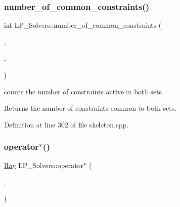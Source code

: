 \mbox{\label{group___c_l_s_solvers_gad030de457424bef601e2903eb619926e}} 
\subsubsection{\texorpdfstring{number\+\_\+of\+\_\+common\+\_\+constraints()}{number\_of\_common\_constraints()}}
{\footnotesize\ttfamily int L\+P\+\_\+\+Solvers\+::number\+\_\+of\+\_\+common\+\_\+constraints (\begin{DoxyParamCaption}\item[{bool $\ast$}]{,  }\item[{bool $\ast$}]{,  }\item[{unsigned}]{ }\end{DoxyParamCaption})}



counts the number of constraints active in both sets 

\begin{DoxyReturn}{Returns}
the number of constraints common to both sets. 
\end{DoxyReturn}


Definition at line 302 of file skeleton.\+cpp.

\mbox{\label{group___c_l_s_solvers_gaf71a7e68f920518b02b6a58660594ca2}} 
\subsubsection{\texorpdfstring{operator$\ast$()}{operator*()}\hspace{0.1cm}{\footnotesize\ttfamily [1/6]}}
{\footnotesize\ttfamily \hyperlink{group___c_l_s_solvers_class_l_p___solvers_1_1_ray}{Ray} L\+P\+\_\+\+Solvers\+::operator$\ast$ (\begin{DoxyParamCaption}\item[{const R\+A\+Y\+E\+N\+T\+\_\+\+T\+Y\+PE}]{,  }\item[{const \hyperlink{group___c_l_s_solvers_class_l_p___solvers_1_1_ray}{Ray} \&}]{ }\end{DoxyParamCaption})}



